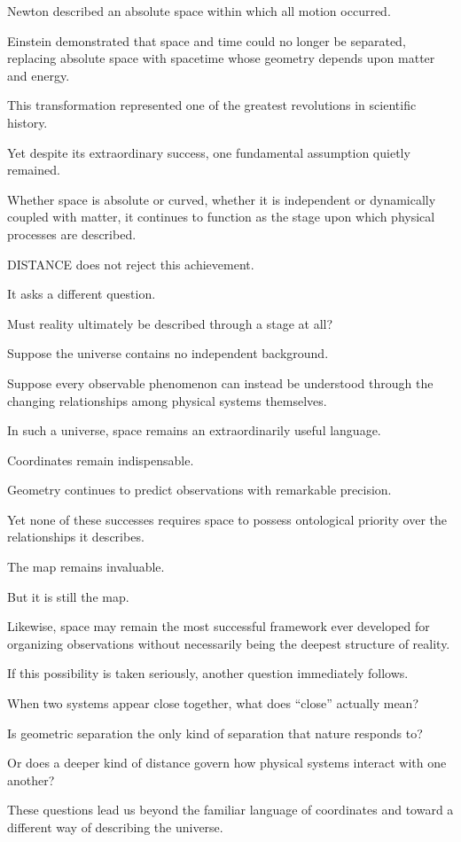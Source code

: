 Newton described an absolute space within which all motion occurred.

Einstein demonstrated that space and time could no longer be separated, replacing absolute space with spacetime whose geometry depends upon matter and energy.

This transformation represented one of the greatest revolutions in scientific history.

Yet despite its extraordinary success, one fundamental assumption quietly remained.

Whether space is absolute or curved, whether it is independent or dynamically coupled with matter, it continues to function as the stage upon which physical processes are described.

DISTANCE does not reject this achievement.

It asks a different question.

Must reality ultimately be described through a stage at all?

Suppose the universe contains no independent background.

Suppose every observable phenomenon can instead be understood through the changing relationships among physical systems themselves.

In such a universe, space remains an extraordinarily useful language.

Coordinates remain indispensable.

Geometry continues to predict observations with remarkable precision.

Yet none of these successes requires space to possess ontological priority over the relationships it describes.

The map remains invaluable.

But it is still the map.

Likewise, space may remain the most successful framework ever developed for organizing observations without necessarily being the deepest structure of reality.

If this possibility is taken seriously, another question immediately follows.

When two systems appear close together, what does “close” actually mean?

Is geometric separation the only kind of separation that nature responds to?

Or does a deeper kind of distance govern how physical systems interact with one another?

These questions lead us beyond the familiar language of coordinates and toward a different way of describing the universe.

